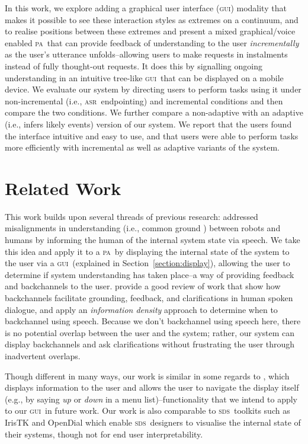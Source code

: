 \documentclass[11pt]{article}
\newcommand{\sds}[0]{\textsc{sds}}
\newcommand{\asr}[0]{\textsc{asr}}
\newcommand{\ui}[0]{\textsc{gui}}
\newcommand{\pa}[0]{\textsc{pa}}
\begin{document}
In this work, we explore adding a graphical user interface (\ui) modality that makes it possible to see these interaction styles as extremes on a continuum, and to realise positions between these extremes and present a mixed graphical/voice enabled \pa\ that can provide feedback of understanding to the user \emph{incrementally} as the user's utterance unfolds--allowing users to make requests in instalments instead of fully thought-out requests. It does this by signalling ongoing understanding in an intuitive tree-like \ui\ that can be displayed on a mobile device. We evaluate our system by directing users to perform tasks using it under non-incremental (i.e., \asr\ endpointing) and incremental conditions and then compare the two conditions. We further compare a non-adaptive with an adaptive (i.e., infers likely events) version of our system. We report that the users found the interface intuitive and easy to use, and that users were able to perform tasks more efficiently with incremental as well as adaptive variants of the system.

\section{Related Work}
\label{section:related_work}

This work builds upon several threads of previous research:  addressed misalignments in understanding (i.e., common ground \cite{clarkschaefer:contrdis}) between robots and humans by informing the human of the internal system state via speech. We take this idea and apply it to a \pa\ by displaying the internal state of the system to the user via a \ui\ (explained in Section~\ref{section:display}), allowing the user to determine if system understanding has taken place--a way of providing feedback and backchannels to the user.  provide a good review of work that show how backchannels facilitate grounding, feedback, and clarifications in human spoken dialogue, and apply an \emph{information density} approach to determine when to backchannel using speech. Because we don't backchannel using speech here, there is no potential overlap between the user and the system; rather, our system can display backchannels and ask clarifications without frustrating the user through inadvertent overlaps.

Though different in many ways, our work is similar in some regards to , which displays information to the user and allows the user to navigate the display itself (e.g., by saying \emph{up} or \emph{down} in a menu list)--functionality that we intend to apply to our \ui\ in future work. Our work is also comparable to \sds\ toolkits such as IrisTK \cite{Skantze2012a} and OpenDial \cite{Lison2015a} which enable \sds\ designers to visualise the internal state of their systems, though not for end user interpretability. 
\end{document}
